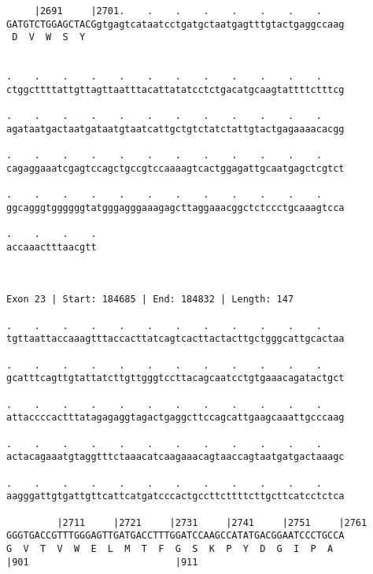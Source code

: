 \documentclass{article}
\begin{document}
\begin{Verbatim}
     |2691     |2701.    .    .    .    .    .    .    .    
GATGTCTGGAGCTACGgtgagtcataatcctgatgctaatgagtttgtactgaggccaag
 D  V  W  S  Y                                              
                                                            
  
.    .    .    .    .    .    .    .    .    .    .    .    
ctggcttttattgttagttaatttacattatatcctctgacatgcaagtattttctttcg
                                                            
.    .    .    .    .    .    .    .    .    .    .    .    
agataatgactaatgataatgtaatcattgctgtctatctattgtactgagaaaacacgg
                                                            
.    .    .    .    .    .    .    .    .    .    .    .    
cagaggaaatcgagtccagctgccgtccaaaagtcactggagattgcaatgagctcgtct
                                                            
.    .    .    .    .    .    .    .    .    .    .    .    
ggcagggtggggggtatgggagggaaagagcttaggaaacggctctccctgcaaagtcca
                                                            
.    .    .    .
accaaactttaacgtt
                
                
 
Exon 23 | Start: 184685 | End: 184832 | Length: 147
 
.    .    .    .    .    .    .    .    .    .    .    .    
tgttaattaccaaagtttaccacttatcagtcacttactacttgctgggcattgcactaa
                                                            
.    .    .    .    .    .    .    .    .    .    .    .    
gcatttcagttgtattatcttgttgggtccttacagcaatcctgtgaaacagatactgct
                                                            
.    .    .    .    .    .    .    .    .    .    .    .    
attaccccactttatagagaggtagactgaggcttccagcattgaagcaaattgcccaag
                                                            
.    .    .    .    .    .    .    .    .    .    .    .    
actacagaaatgtaggtttctaaacatcaagaaacagtaaccagtaatgatgactaaagc
                                                            
.    .    .    .    .    .    .    .    .    .    .    .    
aagggattgtgattgttcattcatgatcccactgccttcttttcttgcttcatcctctca
                                                            
         |2711     |2721     |2731     |2741     |2751     |2761
GGGTGACCGTTTGGGAGTTGATGACCTTTGGATCCAAGCCATATGACGGAATCCCTGCCA
G  V  T  V  W  E  L  M  T  F  G  S  K  P  Y  D  G  I  P  A  
|901                          |911                          
  

\end{Verbatim}
\end{document}

